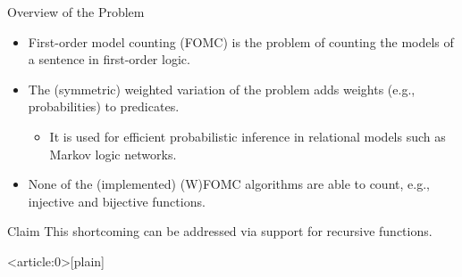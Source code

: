 \documentclass{beamer}
\begin{document}
\begin{frame}{Overview of the Problem}
  \begin{itemize}
    \item \alert{First-order model counting} (FOMC) is the problem of counting
          the models of a sentence in first-order logic.
    \item The \alert{(symmetric) weighted} variation of the problem adds weights
          (e.g., probabilities) to predicates.
          \begin{itemize}
            \item It is used for efficient \alert{probabilistic inference} in
                  relational models such as Markov logic networks.
          \end{itemize}
    \item None of the (implemented) (W)FOMC algorithms are able to count, e.g.,
          \alert{injective} and \alert{bijective} functions.
  \end{itemize}
  \begin{block}{Claim}
    This shortcoming can be addressed via support for \alert{recursive functions}.
  \end{block}
\end{frame}

{ %
    \begin{frame}<article:0>[plain]
     \end{frame}
}
\end{document}
